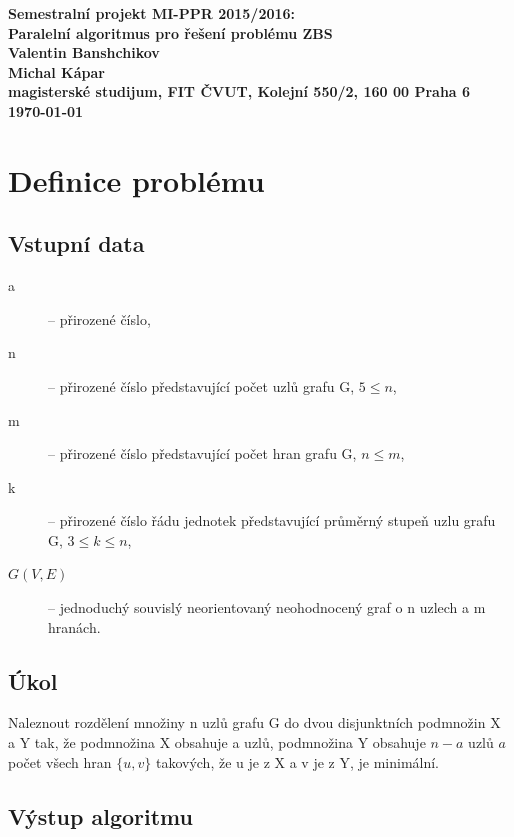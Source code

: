 \documentclass[12pt]{article}
\begin{document}

\begin{center}
\bf Semestralní projekt MI-PPR 2015/2016:\\[5mm]
    Paralelní algoritmus pro řešení problému ZBS\\[5mm]
       Valentin Banshchikov\\
       Michal Kápar\\[2mm]
magisterské studijum, FIT ČVUT, Kolejní 550/2, 160 00 Praha 6\\[2mm]
\today
\end{center}

\section{Definice problému}
\subsection{Vstupní data}

\begin{description}
	\item[a] -- přirozené číslo,
	\item[n] -- přirozené číslo představující počet uzlů grafu G, $5 \leq n$,
	\item[m] -- přirozené číslo představující počet hran grafu G, $n \leq m$,
	\item[k] -- přirozené číslo řádu jednotek představující průměrný stupeň uzlu grafu G, $3 \leq k \leq n$,
	\item[$G(V,E)$] -- jednoduchý souvislý neorientovaný neohodnocený graf o n uzlech a m hranách.
\end{description}

\subsection{Úkol}

Naleznout rozdělení množiny n uzlů grafu G do dvou disjunktních podmnožin X a Y tak, že podmnožina X obsahuje a uzlů, podmnožina Y obsahuje $n-a$ uzlů $a$ počet všech hran $\{u,v\}$ takových, že u je z X a v je z Y, je minimální.

\subsection{Výstup algoritmu}
\end{document}

